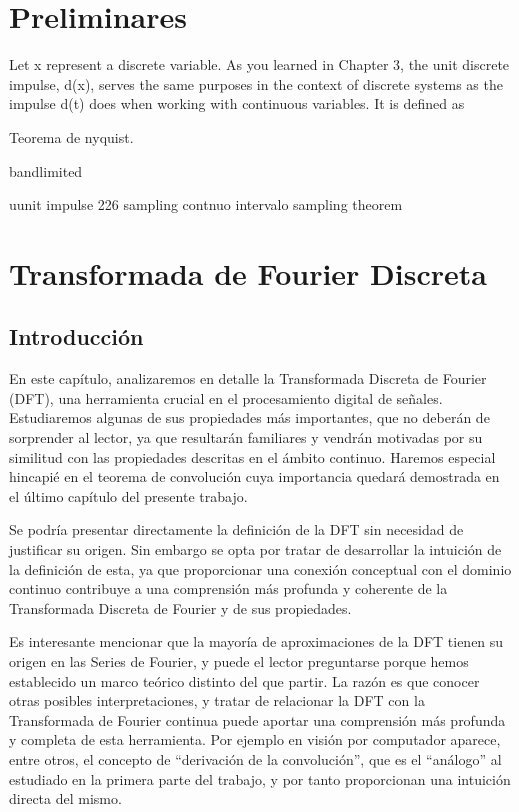 
\chapter{Preliminares}
Let x represent a discrete variable. As you learned in Chapter 3, the unit discrete
impulse, d(x), serves the same purposes in the context of discrete systems as the
impulse d(t) does when working with continuous variables. It is defined as


Teorema de nyquist.

bandlimited

uunit impulse 
226 sampling
contnuo
intervalo sampling theorem
\chapter{Transformada de Fourier Discreta}


\section{Introducción}

En este capítulo, analizaremos  en detalle la Transformada Discreta de Fourier (DFT), una herramienta crucial en el procesamiento digital de señales. Estudiaremos algunas de sus propiedades más importantes, que no deberán de sorprender al lector, ya que resultarán familiares y vendrán motivadas por su similitud con las propiedades descritas en el ámbito continuo. Haremos especial hincapié en el teorema de convolución cuya importancia quedará demostrada en el último capítulo del presente trabajo.

Se podría presentar directamente la definición de la DFT sin necesidad de justificar su origen. Sin embargo se opta por tratar de desarrollar la intuición de la definición de esta, ya que proporcionar una conexión conceptual con el dominio continuo contribuye a una comprensión más profunda y coherente de la Transformada Discreta de Fourier y de sus propiedades.

Es interesante mencionar que la mayoría de aproximaciones de la DFT tienen su origen en las Series de Fourier, y puede el lector preguntarse porque hemos establecido un marco teórico distinto del que partir. La razón es que conocer otras posibles interpretaciones, y tratar de relacionar la DFT con la Transformada de Fourier continua puede aportar una comprensión más profunda y completa de esta herramienta. 
Por ejemplo en visión por computador aparece, entre otros, el concepto de  ``derivación de la convolución'', que es el ``análogo'' al estudiado en la primera parte del trabajo, y por tanto proporcionan una intuición directa del mismo.

